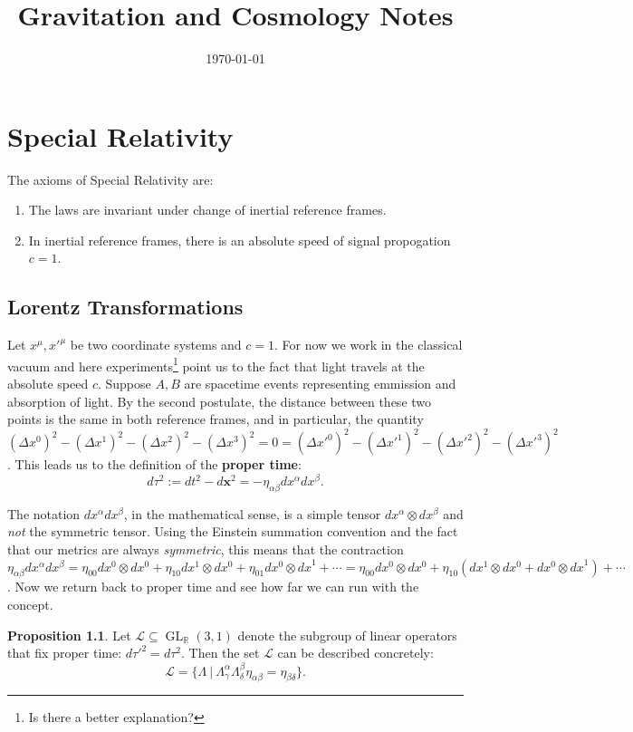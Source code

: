 \documentclass[11pt]{report}
\date{\today}
\title{Gravitation and Cosmology Notes}
\author{}
\newcommand{\RR}{\mathbb{R}}
\newcommand{\ms}{\mathscr}
\newcommand{\ten}{\otimes}
\theoremstyle{plain}
\theoremstyle{definition}
\newtheorem{proposition}{Proposition}
\theoremstyle{remark}
\DeclareMathOperator{\GL}{GL}
\def\seq{\subseteq}
\begin{document}
\maketitle

\chapter{Special Relativity}

The axioms of Special Relativity are:
\begin{enumerate}
    \item The laws are invariant under change of inertial reference frames.
    \item In inertial reference frames, there is an absolute speed of
        signal propogation $c=1$.
\end{enumerate}

\section{Lorentz Transformations}
Let $x^\mu,x'^\mu$ be two coordinate systems and $c=1$. For now we work in the
classical vacuum and here experiments\footnote{Is there a better explanation?}
point us to the fact that light travels at the absolute speed $c$.
Suppose $A,B$ are spacetime events representing emmission and absorption of
light. By the second postulate, the distance between these two points is the
same in both reference frames, and in particular, the quantity 
$(\Delta x^0)^2-(\Delta x^1)^2-(\Delta x^2)^2-(\Delta x^3)^2 = 0 = (\Delta
x'^0)^2-(\Delta x'^1)^2-(\Delta x'^2)^2-(\Delta x'^3)^2$.
This leads us to the definition of the \textbf{proper time}:
\[d\tau^2 := dt^2 - d\bm x^2 = -\eta_{\alpha\beta}dx^\alpha dx^\beta.\]

The notation $dx^\alpha dx^\beta$, in the mathematical sense, is a simple tensor
$dx^\alpha\ten dx^\beta$ and \emph{not} the symmetric tensor. Using the Einstein
summation convention and the fact that our metrics are always \emph{symmetric},
this means that the contraction $\eta_{\alpha\beta}dx^\alpha dx^\beta
=\eta_{00}dx^0\ten dx^0+\eta_{10}dx^1\ten dx^0+\eta_{01}dx^0\ten{dx}^1+\cdots
=\eta_{00}dx^0\ten dx^0+\eta_{10}(dx^1\ten dx^0+dx^0\ten{dx}^1)+\cdots$. Now we
return back to proper time and see how far we can run with the concept.

\begin{proposition} Let $\ms L \seq \GL_\RR(3,1)$ denote the subgroup of linear
operators that fix proper time: $d\tau'^2 = d\tau^2$. Then the set $\ms L$ can
be described concretely:
\[ \ms L = \{ \Lambda\ |\ \Lambda^\alpha_\gamma
\Lambda^\beta_\delta\eta_{\alpha\beta} = \eta_{\beta\delta}\}.\]
\end{proposition}
\end{document}
